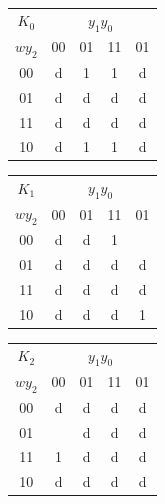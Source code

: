 \documentclass[10pt,a4paper]{scrartcl}
\begin{document}
\begin{tabular}{|c||c|c|c|c|}
  \hline
 $K_0$   & \multicolumn{4}{c|}{$y_1y_0$} \\
  $wy_2$ & 00                 & 01                 & 11                 & 01                 \\ \hline\hline
  00     & \cellcolor{gray}d  & \cellcolor{gray}1  & \cellcolor{gray}1  & \cellcolor{gray}d  \\ \hline
  01     & \cellcolor{gray}d  & \cellcolor{gray}d  & \cellcolor{gray}d  & \cellcolor{gray}d  \\ \hline
  11     & \cellcolor{gray}d  & \cellcolor{gray}d  & \cellcolor{gray}d  & \cellcolor{gray}d  \\ \hline
  10     & \cellcolor{gray}d  & \cellcolor{gray}1  & \cellcolor{gray}1  & \cellcolor{gray}d  \\ \hline
\end{tabular}
\begin{tabular}{|c||c|c|c|c|}
  \hline
 $K_1$   & \multicolumn{4}{c|}{$y_1y_0$} \\
  $wy_2$ & 00                 & 01                 & 11                 & 01                 \\ \hline\hline
  00     & d                  & \cellcolor{gray}d  & \cellcolor{gray}1  &                    \\ \hline
  01     & d                  & \cellcolor{gray}d  & \cellcolor{gray}d  & d                  \\ \hline
  11     & \cellcolor{gray}d  & \cellcolor{gray}d  & \cellcolor{gray}d  & \cellcolor{gray}d  \\ \hline
  10     & \cellcolor{gray}d  & \cellcolor{gray}d  & \cellcolor{gray}d  & \cellcolor{gray}1  \\ \hline
\end{tabular}
\begin{tabular}{|c||c|c|c|c|}
  \hline
 $K_2$   & \multicolumn{4}{c|}{$y_1y_0$} \\
  $wy_2$ & 00                 & 01                 & 11                 & 01                 \\ \hline\hline
  00     & d                  & d                  & d                  & d                  \\ \hline
  01     &                    & d                  & d                  & d                  \\ \hline
  11     & \cellcolor{gray}1  & \cellcolor{gray}d  & \cellcolor{gray}d  & \cellcolor{gray}d  \\ \hline
  10     & \cellcolor{gray}d  & \cellcolor{gray}d  & \cellcolor{gray}d  & \cellcolor{gray}d  \\ \hline
\end{tabular}
\end{document}
